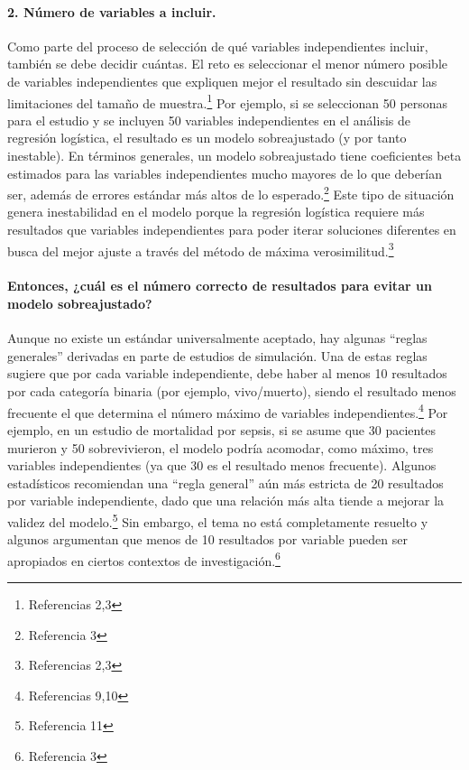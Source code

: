 \documentclass[12pt]{article}
\begin{document}
\paragraph{2. N\'umero de variables a incluir.} Como parte del proceso de selecci\'on de qu\'e variables independientes incluir, tambi\'en se debe decidir cu\'antas. El reto es seleccionar el menor n\'umero posible de variables independientes que expliquen mejor el resultado sin descuidar las limitaciones del tama\~no de muestra.\footnote{Referencias 2,3} Por ejemplo, si se seleccionan 50 personas para el estudio y se incluyen 50 variables independientes en el an\'alisis de regresi\'on log\'istica, el resultado es un modelo sobreajustado (y por tanto inestable). En t\'erminos generales, un modelo sobreajustado tiene coeficientes beta estimados para las variables independientes mucho mayores de lo que deber\'ian ser, adem\'as de errores est\'andar m\'as altos de lo esperado.\footnote{Referencia 3} Este tipo de situaci\'on genera inestabilidad en el modelo porque la regresi\'on log\'istica requiere m\'as resultados que variables independientes para poder iterar soluciones diferentes en busca del mejor ajuste a trav\'es del m\'etodo de m\'axima verosimilitud.\footnote{Referencias 2,3}

\paragraph{Entonces, ¿cu\'al es el n\'umero correcto de resultados para evitar un modelo sobreajustado?} Aunque no existe un est\'andar universalmente aceptado, hay algunas “reglas generales” derivadas en parte de estudios de simulaci\'on. Una de estas reglas sugiere que por cada variable independiente, debe haber al menos 10 resultados por cada categor\'ia binaria (por ejemplo, vivo/muerto), siendo el resultado menos frecuente el que determina el n\'umero m\'aximo de variables independientes.\footnote{Referencias 9,10} Por ejemplo, en un estudio de mortalidad por sepsis, si se asume que 30 pacientes murieron y 50 sobrevivieron, el modelo podr\'ia acomodar, como m\'aximo, tres variables independientes (ya que 30 es el resultado menos frecuente). Algunos estad\'isticos recomiendan una “regla general” a\'un m\'as estricta de 20 resultados por variable independiente, dado que una relaci\'on m\'as alta tiende a mejorar la validez del modelo.\footnote{Referencia 11} Sin embargo, el tema no est\'a completamente resuelto y algunos argumentan que menos de 10 resultados por variable pueden ser apropiados en ciertos contextos de investigaci\'on.\footnote{Referencia 3}
\end{document}
